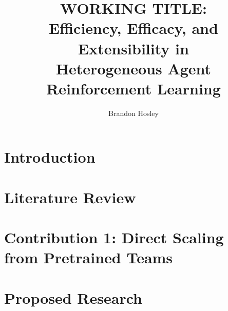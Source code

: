 \documentclass{afitthesis}
\title{ WORKING TITLE:\\
    Efficiency, Efficacy, and Extensibility in\\
    Heterogeneous Agent Reinforcement Learning }
\author{Brandon Hosley}
\begin{document}
\maketitle %


\chapter{Introduction}%


\chapter{Literature Review}%
\label{ch:literature_review}


\chapter{Contribution 1: Direct Scaling from Pretrained Teams}
\label{ch:contribution_1}


\label{ch:contribution_2}
% 

\label{ch:contribution_3}
% 

\chapter{Proposed Research}%
\label{ch:methodology}

\end{document}
